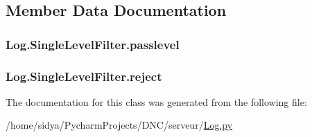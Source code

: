 \subsection{Member Data Documentation}
\hypertarget{class_log_1_1_single_level_filter_abae072b8db802c0e4c4ab15823020916}{}
\subsubsection[{passlevel}]{\setlength{\rightskip}{0pt plus 5cm}Log.\+Single\+Level\+Filter.\+passlevel}\label{class_log_1_1_single_level_filter_abae072b8db802c0e4c4ab15823020916}
\hypertarget{class_log_1_1_single_level_filter_a4a0c91f813f78d0f28435283661c44c7}{}
\subsubsection[{reject}]{\setlength{\rightskip}{0pt plus 5cm}Log.\+Single\+Level\+Filter.\+reject}\label{class_log_1_1_single_level_filter_a4a0c91f813f78d0f28435283661c44c7}


The documentation for this class was generated from the following file\+:\begin{DoxyCompactItemize}
\item 
/home/sidya/\+Pycharm\+Projects/\+D\+N\+C/serveur/\hyperlink{_log_8py}{Log.\+py}\end{DoxyCompactItemize}
